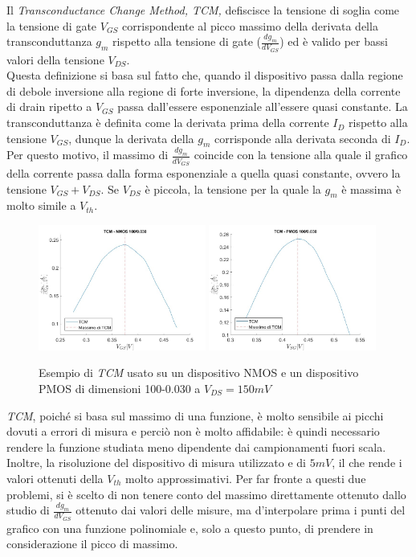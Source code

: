 \documentclass[
	a4paper,
	cleardoublepage=empty,
	headings=twolinechapter,
	numbers=autoenddot,
]{scrbook}
\begin{document}
Il
\emph{Transconductance Change Method, TCM,} defiscisce la tensione di soglia come la tensione di gate $V_{GS}$ corrispondente al picco massimo
della derivata della transconduttanza $g_m$ rispetto alla tensione di gate
($\frac{dg_m}{dV_ {GS}}$) ed è valido per bassi valori della tensione $V_{DS}$.\\
Questa definizione si basa sul fatto che, quando il dispositivo passa dalla regione di debole inversione alla regione di forte inversione, la dipendenza della corrente di drain ripetto a $V_{GS}$ passa dall'essere esponenziale all'essere quasi constante.
La transconduttanza è definita come la derivata prima della corrente $I_D$ rispetto alla tensione $V_{GS}$, dunque la derivata della $g_m$ corrisponde alla derivata seconda di $I_D$. Per questo motivo, il massimo di $\frac{dg_m}{dV_{GS}}$ coincide con la tensione alla quale il grafico della corrente passa dalla forma esponenziale a quella quasi constante, ovvero la tensione $V_{GS}+V_{DS}$. Se $V_{DS}$ è piccola, la tensione per la quale la $g_m$ è massima è molto simile a $V_{th}$.\\

\begin{figure}[h!]
  \centering
  \includegraphics[width=0.49\textwidth]{TCM-N4-100-30-NoFit}
  \includegraphics[width=0.49\textwidth]{TCM-P1-100-30-NoFit}
  \caption{Esempio di \emph{TCM} usato su un dispositivo NMOS e un dispositivo PMOS di dimensioni 100-0.030 a $V_{DS} = 150 mV$}
\end{figure}

\emph{TCM},
poiché si basa sul massimo di una funzione, è molto sensibile ai picchi dovuti a errori di misura e perciò non è molto affidabile:
è quindi necessario rendere la funzione studiata meno dipendente dai campionamenti fuori scala. Inoltre, la risoluzione del dispositivo di misura utilizzato e di $5 mV$, il che rende i valori ottenuti della $V_{th}$ molto approssimativi.
Per far fronte a questi due problemi, si è scelto di non tenere conto del massimo direttamente ottenuto dallo studio di $\frac{dg_m}{dV_{GS}}$ ottenuto dai valori delle misure, ma d'interpolare prima i punti del grafico con una funzione polinomiale e, solo a questo punto, di prendere in considerazione il picco di massimo. \\
\end{document}
